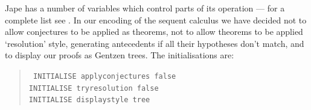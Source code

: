 Jape has a number of variables which control parts of its operation --- for a complete list see . In our encoding of the sequent calculus we have decided not to allow conjectures to be applied as theorems, not to allow theorems to be applied `resolution' style, generating antecedents if all their hypotheses don't match, and to display our proofs as Gentzen trees. The initialisations are:

\begin{quote}\tt\small
INITIALISE applyconjectures false\\
INITIALISE tryresolution false\\
INITIALISE displaystyle tree
\end{quote}

\begin{figure}
\centering
{}\qquad
{}\qquad
{}\qquad

\end{figure}
